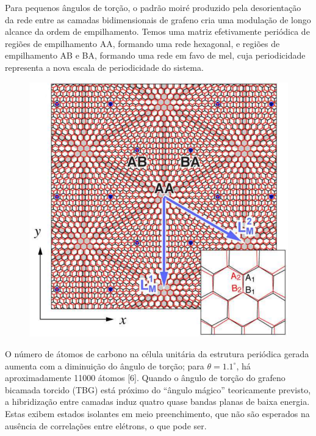 \documentclass[10pt,aspectratio=169,xcolor={table,dvipsnames,usenames}]{beamer}
\begin{document}

\begin{frame}%

Para pequenos ângulos de torção, o padrão moiré produzido pela desorientação da rede entre as camadas bidimensionais de grafeno cria uma modulação de longo alcance da ordem de empilhamento. Temos uma matriz efetivamente periódica de regiões de empilhamento AA, formando uma rede hexagonal, e regiões de empilhamento AB e BA, formando uma rede em favo de mel, cuja periodicidade representa a nova escala de periodicidade do sistema.

\begin{figure}[H]
\centering
\includegraphics[height=0.32\linewidth]{fig/AA_AB.png}
\label{fig:AA_AB}
\end{figure}


O número de átomos de carbono na célula unitária da estrutura periódica gerada aumenta com a diminuição do ângulo de torção; para $\theta=1.1^\circ$, há aproximadamente 11000 átomos [6]. Quando o ângulo de torção do grafeno bicamada torcido (TBG) está próximo do ``ângulo mágico'' teoricamente previsto, a hibridização entre camadas induz quatro quase bandas planas de baixa energia. Estas exibem estados isolantes em meio preenchimento, que não são esperados na ausência de correlações entre elétrons, o que pode ser.

\end{frame}


\end{document}
